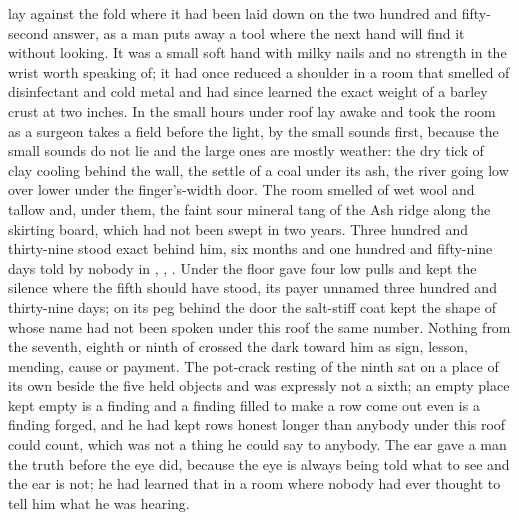 
 lay against the fold where it had been laid down on the two hundred and fifty-second answer, as a man puts away a tool where the next hand will find it without looking. It was a small soft hand with milky nails and no strength in the wrist worth speaking of; it had once reduced a shoulder in a room that smelled of disinfectant and cold metal and had since learned the exact weight of a barley crust at two inches. In the small hours under  roof  lay awake and took the room as a surgeon takes a field before the light, by the small sounds first, because the small sounds do not lie and the large ones are mostly weather: the dry tick of clay cooling behind the wall, the settle of a coal under its ash, the river going low over lower under the finger's-width door. The room smelled of wet wool and tallow and, under them, the faint sour mineral tang of the Ash ridge along the skirting board, which had not been swept in two years. Three hundred and thirty-nine stood exact behind him, six months and one hundred and fifty-nine days told by nobody in , , . Under the floor  gave four low pulls and kept the silence where the fifth should have stood, its payer unnamed three hundred and thirty-nine days; on its peg behind the door the salt-stiff coat kept the shape of  whose name had not been spoken under this roof the same number. Nothing from the seventh, eighth or ninth of  crossed the dark toward him as sign, lesson, mending, cause or payment. The pot-crack resting of the ninth sat on a place of its own beside the five held objects and was expressly not a sixth; an empty place kept empty is a finding and a finding filled to make a row come out even is a finding forged, and he had kept rows honest longer than anybody under this roof could count, which was not a thing he could say to anybody. The ear gave a man the truth before the eye did, because the eye is always being told what to see and the ear is not; he had learned that in a room where nobody had ever thought to tell him what he was hearing.

